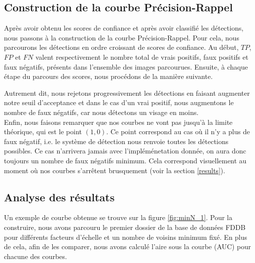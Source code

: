 \documentclass[a4paper,11pt]{article}
\begin{document}
    \subsection{Construction de la courbe Précision-Rappel}
    \label{construction_courbe}
        
        Après avoir obtenu les scores de confiance et après avoir classifié les détections, nous passons à la construction de la courbe Précision-Rappel.
        Pour cela, nous parcourons les détections en ordre croissant de scores de confiance.
        Au début, $TP$, $FP$ et $FN$ valent respectivement le nombre total de vrais positifs, faux positifs et faux négatifs, présents dans l'ensemble des images parcourues.
        Ensuite, à chaque étape du parcours des scores, nous procédons de la manière suivante.

        \begin{algorithm}[H]
        \end{algorithm}
        Autrement dit, nous rejetons progressivement les détections en faisant augmenter notre seuil d'acceptance et dans le cas d'un vrai positif, nous augmentons le nombre de faux négatifs, car nous détectons un visage en moins.
        \\
        Enfin, nous faisons remarquer que nos courbes ne vont pas jusqu'à la limite théorique, qui est le point $(1,0)$. 
        Ce point correspond au cas où il n'y a plus de faux négatif, i.e. le système de détection nous renvoie toutes les détections possibles.
        Ce cas n'arrivera jamais avec l'impléménetation donnée, on aura donc toujours un nombre de faux négatifs minimum.
        Cela correspond visuellement au moment où nos courbes s'arrêtent brusquement (voir la section \ref{results}).

    \subsection{Analyse des résultats}
        
        Un exemple de courbe obtenue se trouve sur la figure \ref{fig:minN_1}.
        Pour la construire, nous avons parcouru le premier dossier de la base de données FDDB pour différents facteurs d'échelle et un nombre de voisins minimum fixé.
        En plus de cela, afin de les comparer, nous avons calculé l'aire sous la courbe (AUC) pour chacune des courbes.
        
\end{document}

